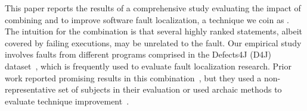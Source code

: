 \documentclass{article}
\begin{document}


This paper reports the results of a comprehensive study evaluating the
impact of combining \ds{} and \sfl{} to improve software fault
localization, a technique we coin as \comb{}. The intuition for the combination is that
several highly ranked statements, albeit covered by failing
executions, may be unrelated to the fault. Our empirical study involves
\numFaults{} faults from \numPrograms{} different programs comprised
in the Defects4J (D4J) dataset~\cite{just-defects4j-issta2014}, which
is frequently used to evaluate fault localization research. Prior work
reported promising results in this
combination~\cite{Wotawa:2010:FLB:1848650.1849235,Alves:2011:FUD:2190078.2190115,DBLP:conf/ecai/HoferW12,lei-mao-dai-wang-2012,slicing-sfl-repair},
but they used a non-representative set of subjects in their evaluation
or used archaic methods to evaluate technique
improvement~\cite{Wu:2014:CLC:2610384.2610386,Lucia:2014:FFL:2642937.2642983,Wen:2016:LLB:2970276.2970359}.
\end{document}
